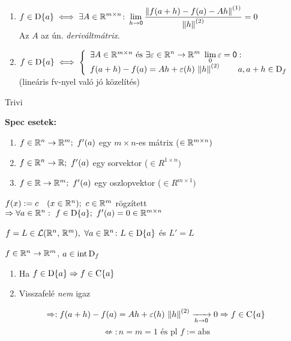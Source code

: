 \begin{te}\ 
  \begin{enumerate}
    \item $\displaystyle f\in\operatorname{D}\{a\} \iff  \exists A\in\mathbb{R}^{m\times n}\colon  \lim_{h\to\mathsf{0}} \dfrac{\left\Vert f(a+h) -f(a) -Ah\right\Vert^{(1)}}{
    \left\Vert h\right\Vert^{(2)}} = 0$\\
      Az $A$ az ún. \emph{deriváltmátrix}.
    \item $f\in\operatorname{D}\{a\}  \iff \left\{\begin{array}{l}\exists A\in\mathbb{R}^{m\times n} \text{  és } \displaystyle\exists \varepsilon \in\mathbb{R}^n\to\mathbb{R}^m\
    \lim_0\varepsilon=\mathsf{0} :\\f(a+h) -f(a)= Ah + \varepsilon(h)\,\left\Vert h\right\Vert^{(2)}\qquad a,a+h\in \operatorname{D}_f\end{array}\right.$\\
      (lineáris fv-nyel való jó közelítés)
  \end{enumerate}
\end{te}
\begin{biz}Trivi\end{biz}
  

\textbf{Spec esetek:}
\begin{enumerate}
  \item $f\in\mathbb{R}^n\to\mathbb{R}^m;\ f'(a)$ egy $m\times n$-es mátrix ($\in\mathbb{R}^{m\times n})$
  \item $f\in\mathbb{R}^n\to\mathbb{R};\ f'(a)$ egy sorvektor  ($\in R^{1\times n})$
  \item $f\in\mathbb{R}\to\mathbb{R}^m;\ f'(a)$ egy oszlopvektor ($\in R^{m\times1})$   
\end{enumerate}


\begin{Pl}
\item $f(x):=c\quad(x\in\mathbb{R}^n);\ c\in\mathbb{R}^m$ rögzített $\nn \forall a\in\R^n:\ f\in\der{a};\ f'(a)=0\in\Rmn$
\item $f=L\in\mathcal{L}(\mathbb{R}^n,\,\mathbb{R}^m),\ \forall a\in\mathbb{R}^n\colon L\in\operatorname{D}\{a\}$ és $L'=L$
\end{Pl}

\begin{te}
  $f\in\mathbb{R}^n\to\mathbb{R}^m$, $a\in\operatorname{int\,D}_f$
  \begin{enumerate}
    \item Ha $f\in\operatorname{D}\{a\}\Rightarrow f\in\operatorname{C}\{a\}$
    \item Visszafelé \emph{nem} igaz
  \end{enumerate}
\end{te}
\begin{biz}
  \[\Rightarrow: f(a+h) -f(a) = Ah + \varepsilon(h)\,\left\Vert h\right\Vert^{(2)}\xrightarrow[h\to\mathsf{0}]{}0 \Rightarrow f\in\operatorname{C}\{a\}\]
  \[\not\Leftarrow: n=m=1 \text{ és pl } f := \mathrm{abs}\]
\end{biz}

